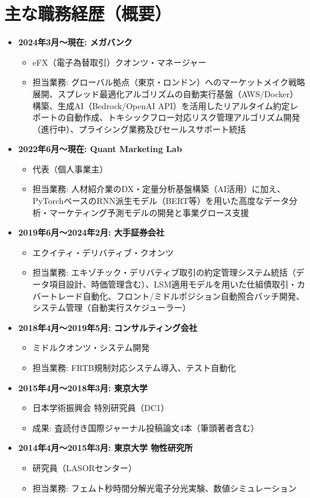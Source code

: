 \documentclass[uplatex,a4j,10.5pt,dvipdfmx]{jsarticle}
\begin{document}
\section{主な職務経歴（概要）}
\begin{itemize}[leftmargin=*]
	\item \textbf{2024年3月～現在: メガバンク}
	      \begin{itemize}
		      \item eFX（電子為替取引）クオンツ・マネージャー
		      \item 担当業務: グローバル拠点（東京・ロンドン）へのマーケットメイク戦略展開、スプレッド最適化アルゴリズムの自動実行基盤（AWS/Docker）構築、生成AI（Bedrock/OpenAI API）を活用したリアルタイム約定レポートの自動作成、トキシックフロー対応リスク管理アルゴリズム開発（進行中）、プライシング業務及びセールスサポート統括
	      \end{itemize}
	\item \textbf{2022年6月～現在: Quant Marketing Lab}
	      \begin{itemize}
		      \item 代表（個人事業主）
		      \item 担当業務: 人材紹介業のDX・定量分析基盤構築（AI活用）に加え、PyTorchベースのRNN派生モデル（BERT等）を用いた高度なデータ分析・マーケティング予測モデルの開発と事業グロース支援
	      \end{itemize}
	\item \textbf{2019年6月～2024年2月: 大手証券会社}
	      \begin{itemize}
		      \item エクイティ・デリバティブ・クオンツ
		      \item 担当業務: エキゾチック・デリバティブ取引の約定管理システム統括（データ項目設計、時価管理含む）、LSM適用モデルを用いた仕組債取引・カバートレード自動化、フロント/ミドルポジション自動照合バッチ開発、システム管理（自動実行スケジューラー）
	      \end{itemize}
	\item \textbf{2018年4月～2019年5月: コンサルティング会社}
	      \begin{itemize}
		      \item ミドルクオンツ・システム開発
		      \item 担当業務: FRTB規制対応システム導入、テスト自動化
	      \end{itemize}
	\item \textbf{2015年4月～2018年3月: 東京大学}
	      \begin{itemize}
		      \item 日本学術振興会 特別研究員（DC1）
		      \item 成果: 査読付き国際ジャーナル投稿論文4本（筆頭著者含む）
	      \end{itemize}
	\item \textbf{2014年4月～2015年3月: 東京大学 物性研究所}
	      \begin{itemize}
		      \item 研究員（LASORセンター）
		      \item 担当業務: フェムト秒時間分解光電子分光実験、数値シミュレーション
	      \end{itemize}
\end{itemize}
\end{document}
